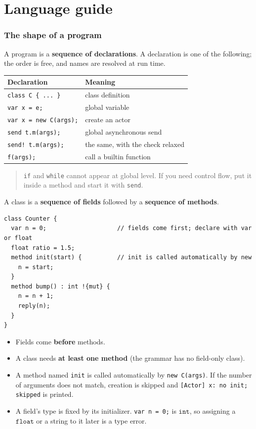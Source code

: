 \documentclass[11pt,a4paper]{article}
\newcommand{\ty}[1]{\ensuremath{\mathtt{#1}}}
\begin{document}
\part{Language guide}
\label{part:lang}

\section{The shape of a program}

A program is a \textbf{sequence of declarations}. A declaration is one of the
following; the order is free, and names are resolved at run time.

\begin{center}
\begin{tabular}{@{}ll@{}}
\toprule
Declaration & Meaning \\
\midrule
\texttt{class C \{ ... \}}            & class definition \\
\texttt{var x = e;}                   & global variable \\
\texttt{var x = new C(args);}         & create an actor \\
\texttt{send t.m(args);}              & global asynchronous send \\
\texttt{send! t.m(args);}             & the same, with the check relaxed \\
\texttt{f(args);}                     & call a builtin function \\
\bottomrule
\end{tabular}
\end{center}

\begin{quote}\small
\texttt{if} and \texttt{while} cannot appear at global level. If you need
control flow, put it inside a method and start it with \texttt{send}.
\end{quote}

A class is a \textbf{sequence of fields} followed by a \textbf{sequence of
methods}.

\begin{lstlisting}
class Counter {
  var n = 0;                    // fields come first; declare with var or float
  float ratio = 1.5;
  method init(start) {          // init is called automatically by new
    n = start;
  }
  method bump() : int !{mut} {
    n = n + 1;
    reply(n);
  }
}
\end{lstlisting}

\begin{itemize}
\item Fields come \textbf{before} methods.
\item A class needs \textbf{at least one method} (the grammar has no
  field-only class).
\item A method named \texttt{init} is called automatically by
  \texttt{new C(args)}. If the number of arguments does not match, creation is
  skipped and \texttt{[Actor] x: no init; skipped} is printed.
\item A field's type is fixed by its initializer. \texttt{var n = 0;} is
  \ty{int}, so assigning a \ty{float} or a string to it later is a type error.
\end{itemize}
\end{document}
